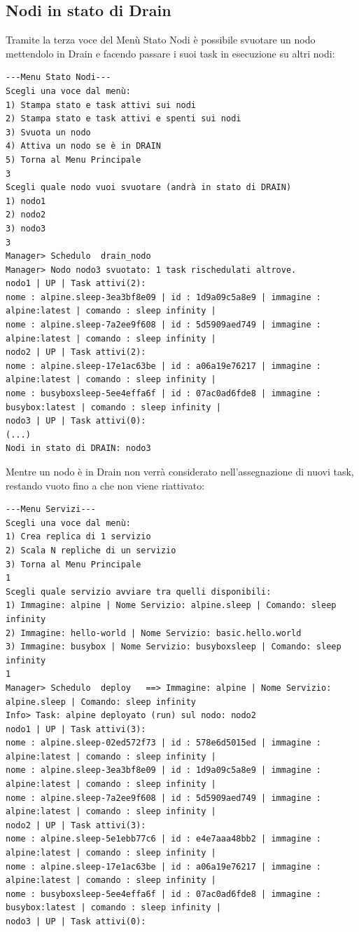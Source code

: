 \documentclass[12pt,a4paper]{article}
\begin{document}
\subsection{Nodi in stato di Drain}
Tramite la terza voce del Menù Stato Nodi è possibile svuotare un nodo mettendolo in Drain e facendo passare i suoi task in esecuzione su altri nodi:
\begin{verbatim}
---Menu Stato Nodi---
Scegli una voce dal menù:
1) Stampa stato e task attivi sui nodi
2) Stampa stato e task attivi e spenti sui nodi
3) Svuota un nodo 
4) Attiva un nodo se è in DRAIN 
5) Torna al Menu Principale
3
Scegli quale nodo vuoi svuotare (andrà in stato di DRAIN)
1) nodo1
2) nodo2
3) nodo3
3
Manager> Schedulo  drain_nodo
Manager> Nodo nodo3 svuotato: 1 task rischedulati altrove.
nodo1 | UP | Task attivi(2): 
nome : alpine.sleep-3ea3bf8e09 | id : 1d9a09c5a8e9 | immagine : alpine:latest | comando : sleep infinity | 
nome : alpine.sleep-7a2ee9f608 | id : 5d5909aed749 | immagine : alpine:latest | comando : sleep infinity | 
nodo2 | UP | Task attivi(2): 
nome : alpine.sleep-17e1ac63be | id : a06a19e76217 | immagine : alpine:latest | comando : sleep infinity | 
nome : busyboxsleep-5ee4effa6f | id : 07ac0ad6fde8 | immagine : busybox:latest | comando : sleep infinity | 
nodo3 | UP | Task attivi(0):
(...)
Nodi in stato di DRAIN: nodo3
\end{verbatim}
Mentre un nodo è in Drain non verrà considerato nell'assegnazione di nuovi task, restando vuoto fino a che non viene riattivato:
\begin{verbatim}
---Menu Servizi---
Scegli una voce dal menù:
1) Crea replica di 1 servizio
2) Scala N repliche di un servizio
3) Torna al Menu Principale
1
Scegli quale servizio avviare tra quelli disponibili:
1) Immagine: alpine | Nome Servizio: alpine.sleep | Comando: sleep infinity
2) Immagine: hello-world | Nome Servizio: basic.hello.world
3) Immagine: busybox | Nome Servizio: busyboxsleep | Comando: sleep infinity
1
Manager> Schedulo  deploy   ==> Immagine: alpine | Nome Servizio: alpine.sleep | Comando: sleep infinity
Info> Task: alpine deployato (run) sul nodo: nodo2
nodo1 | UP | Task attivi(3): 
nome : alpine.sleep-02ed572f73 | id : 578e6d5015ed | immagine : alpine:latest | comando : sleep infinity | 
nome : alpine.sleep-3ea3bf8e09 | id : 1d9a09c5a8e9 | immagine : alpine:latest | comando : sleep infinity | 
nome : alpine.sleep-7a2ee9f608 | id : 5d5909aed749 | immagine : alpine:latest | comando : sleep infinity | 
nodo2 | UP | Task attivi(3): 
nome : alpine.sleep-5e1ebb77c6 | id : e4e7aaa48bb2 | immagine : alpine:latest | comando : sleep infinity | 
nome : alpine.sleep-17e1ac63be | id : a06a19e76217 | immagine : alpine:latest | comando : sleep infinity | 
nome : busyboxsleep-5ee4effa6f | id : 07ac0ad6fde8 | immagine : busybox:latest | comando : sleep infinity | 
nodo3 | UP | Task attivi(0): 
\end{verbatim}
\end{document}
